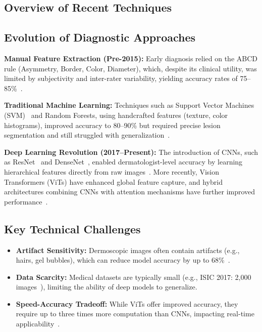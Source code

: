 \documentclass[a4paper,12pt]{report}
\begin{document}
\begin{spacing}{1.5}
    \section{Overview of Recent Techniques}
        
        \subsection*{Evolution of Diagnostic Approaches}
        
        \textbf{Manual Feature Extraction (Pre-2015):}  
        Early diagnosis relied on the ABCD rule (Asymmetry, Border, Color, Diameter), which, despite its clinical utility, was limited by subjectivity and inter-rater variability, yielding accuracy rates of 75–85\%~\cite{dl14,dl15}.
        
        \textbf{Traditional Machine Learning:}  
        Techniques such as Support Vector Machines (SVM)~\cite{dl7,dl14} and Random Forests, using handcrafted features (texture, color histograms), improved accuracy to 80–90\% but required precise lesion segmentation and still struggled with generalization~\cite{dl7,elgendi2023diagnostics}.
        
        \textbf{Deep Learning Revolution (2017–Present):}  
        The introduction of CNNs, such as ResNet~\cite{dl6} and DenseNet~\cite{elgendi2023diagnostics}, enabled dermatologist-level accuracy by learning hierarchical features directly from raw images~\cite{dl5}. More recently, Vision Transformers (ViTs) have enhanced global feature capture, and hybrid architectures combining CNNs with attention mechanisms have further improved performance~\cite{elgendi2023diagnostics}.
        
        \subsection*{Key Technical Challenges}
        
        \begin{itemize}
            \item \textbf{Artifact Sensitivity:} Dermoscopic images often contain artifacts (e.g., hairs, gel bubbles), which can reduce model accuracy by up to 68\%~\cite{lafraxo2022melanet,elgendi2023diagnostics}.
            \item \textbf{Data Scarcity:} Medical datasets are typically small (e.g., ISIC 2017: 2,000 images~\cite{dl14,lafraxo2022melanet}), limiting the ability of deep models to generalize.
            \item \textbf{Speed-Accuracy Tradeoff:} While ViTs offer improved accuracy, they require up to three times more computation than CNNs, impacting real-time applicability~\cite{elgendi2023diagnostics}.
        \end{itemize}
    

\end{spacing}
\end{document}
